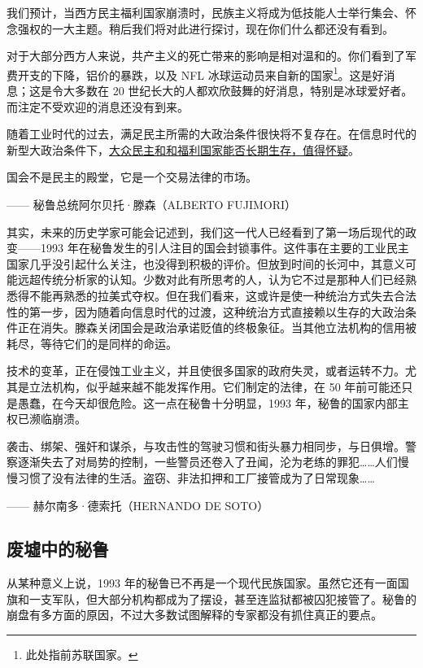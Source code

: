 我们预计，当西方民主福利国家崩溃时，民族主义将成为低技能人士举行集会、怀念强权的一大主题。稍后我们将对此进行探讨，现在你们什么都还没有看到。

对于大部分西方人来说，共产主义的死亡带来的影响是相对温和的。你们看到了军费开支的下降，铝价的暴跌，以及 NFL 冰球运动员来自新的国家\footnote{此处指前苏联国家。}。这是好消息；这是令大多数在 20 世纪长大的人都欢欣鼓舞的好消息，特别是冰球爱好者。而注定不受欢迎的消息还没有到来。

随着工业时代的过去，满足民主所需的大政治条件很快将不复存在。在信息时代的新型大政治条件下，\uline{大众民主和和福利国家能否长期生存，值得怀疑}。

\begin{tcolorbox}
\kaishu 国会不是民主的殿堂，它是一个交易法律的市场。
\begin{flushright}
—— 秘鲁总统阿尔贝托·滕森（ALBERTO FUJIMORI）
\end{flushright}
\end{tcolorbox}

其实，未来的历史学家可能会记述到，我们这一代人已经看到了第一场后现代的政变——1993 年在秘鲁发生的引人注目的国会封锁事件。这件事在主要的工业民主国家几乎没引起什么关注，也没得到积极的评价。但放到时间的长河中，其意义可能远超传统分析家的认知。少数对此有所思考的人，认为它不过是那种人们已经熟悉得不能再熟悉的拉美式夺权。但在我们看来，这或许是使一种统治方式失去合法性的第一步，因为随着向信息时代的过渡，这种统治方式直接赖以生存的大政治条件正在消失。滕森关闭国会是政治承诺贬值的终极象征。当其他立法机构的信用被耗尽，等待它们的是同样的命运。

技术的变革，正在侵蚀工业主义，并且使很多国家的政府失灵，或者运转不力。尤其是立法机构，似乎越来越不能发挥作用。它们制定的法律，在 50 年前可能还只是愚蠢，在今天却很危险。这一点在秘鲁十分明显，1993 年，秘鲁的国家内部主权已濒临崩溃。

\begin{tcolorbox}
\kaishu 袭击、绑架、强奸和谋杀，与攻击性的驾驶习惯和街头暴力相同步，与日俱增。警察逐渐失去了对局势的控制，一些警员还卷入了丑闻，沦为老练的罪犯……人们慢慢习惯了没有法律的生活。盗窃、非法扣押和工厂接管成为了日常现象……
\begin{flushright}
—— 赫尔南多·德索托（HERNANDO DE SOTO）
\end{flushright}
\end{tcolorbox}

\subsection{废墟中的秘鲁}
从某种意义上说，1993 年的秘鲁已不再是一个现代民族国家。虽然它还有一面国旗和一支军队，但大部分机构都成为了摆设，甚至连监狱都被囚犯接管了。秘鲁的崩盘有多方面的原因，不过大多数试图解释的专家都没有抓住真正的要点。

